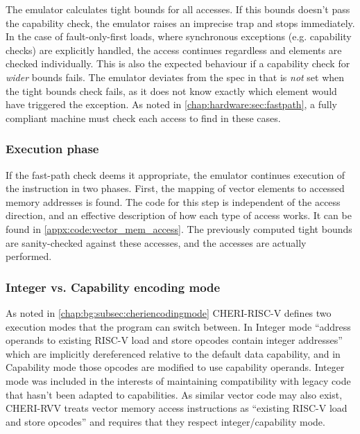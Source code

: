 The emulator calculates tight bounds for all accesses.
If this bounds doesn't pass the capability check, the emulator raises an imprecise trap and stops immediately.
In the case of fault-only-first loads, where synchronous exceptions (e.g. capability checks) are explicitly handled, the access continues regardless and elements are checked individually.
This is also the expected behaviour if a capability check for \emph{wider} bounds fails.
The emulator deviates from the spec in that  is \emph{not} set when the tight bounds check fails, as it does not know exactly which element would have triggered the exception.
As noted in \cref{chap:hardware:sec:fastpath}, a fully compliant machine must check each access to find  in these cases.

\subsubsection{Execution phase}\label{chap:hardware:subsec:execution}
If the fast-path check deems it appropriate, the emulator continues execution of the instruction in two phases.
First, the mapping of vector elements to accessed memory addresses is found.
The code for this step is independent of the access direction, and an effective description of how each type of access works.
It can be found in \cref{appx:code:vector_mem_access}.
The previously computed tight bounds are sanity-checked against these accesses, and the accesses are actually performed.

\subsubsection{Integer vs. Capability encoding mode\label{chap:emu:rvv_int_mode}}
As noted in \cref{chap:bg:subsec:cheriencodingmode} CHERI-RISC-V defines two execution modes that the program can switch between.
In Integer mode \enquote{address operands to existing RISC-V load and store opcodes contain integer addresses} which are implicitly dereferenced relative to the default data capability, and in Capability mode those opcodes are modified to use capability operands.
Integer mode was included in the interests of maintaining compatibility with legacy code that hasn't been adapted to capabilities.
As similar vector code may also exist, CHERI-RVV treats vector memory access instructions as \enquote{existing RISC-V load and store opcodes} and requires that they respect integer/capability mode.
